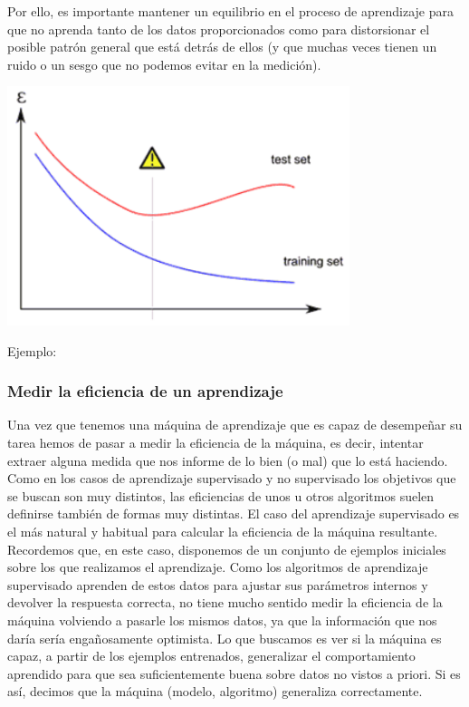 \documentclass[12pt,a4paper]{report}
\begin{document}
Por ello, es importante mantener un equilibrio en el proceso de aprendizaje para que no aprenda tanto de los datos proporcionados como para distorsionar el posible patrón general que está detrás de ellos (y que muchas veces tienen un ruido o un sesgo que no podemos evitar en la medición).

\includegraphics[width=10cm]{./images/9}\par\vspace{1cm}

Ejemplo:
\subsubsection{Medir la eficiencia de un aprendizaje}
Una vez que tenemos una máquina de aprendizaje que es capaz de desempeñar su tarea hemos de pasar a medir la eficiencia de la máquina, es decir, intentar extraer alguna medida que nos informe de lo bien (o mal) que lo está haciendo. Como en los casos de aprendizaje supervisado y no supervisado los objetivos que se buscan son muy distintos, las eficiencias de unos u otros algoritmos suelen definirse también de formas muy distintas.
El caso del aprendizaje supervisado es el más natural y habitual para calcular la eficiencia de la máquina resultante. Recordemos que, en este caso, disponemos de un conjunto de ejemplos iniciales sobre los que realizamos el aprendizaje. Como los algoritmos de aprendizaje supervisado aprenden de estos datos para ajustar sus parámetros internos y devolver la respuesta correcta, no tiene mucho sentido medir la eficiencia de la máquina volviendo a pasarle los mismos datos, ya que la información que nos daría sería engañosamente optimista. Lo que buscamos es ver si la máquina es capaz, a partir de los ejemplos entrenados, generalizar el comportamiento aprendido para que sea suficientemente buena sobre datos no vistos a priori. Si es así, decimos que la máquina (modelo, algoritmo) generaliza correctamente. 
\end{document}
